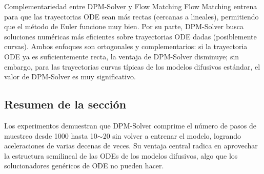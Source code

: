 \begin{knowledgebox}{Complementariedad entre DPM-Solver y Flow Matching}
Flow Matching entrena para que las trayectorias ODE sean más rectas (cercanas a lineales), permitiendo que el método de Euler funcione muy bien. Por su parte, DPM-Solver busca soluciones numéricas más eficientes sobre trayectorias ODE dadas (posiblemente curvas). Ambos enfoques son ortogonales y complementarios: si la trayectoria ODE ya es suficientemente recta, la ventaja de DPM-Solver disminuye; sin embargo, para las trayectorias curvas típicas de los modelos difusivos estándar, el valor de DPM-Solver es muy significativo.
\end{knowledgebox}

\subsection{Resumen de la sección}

Los experimentos demuestran que DPM-Solver comprime el número de pasos de muestreo desde 1000 hasta 10$\sim$20 sin volver a entrenar el modelo, logrando aceleraciones de varias decenas de veces. Su ventaja central radica en aprovechar la estructura semilineal de las ODEs de los modelos difusivos, algo que los solucionadores genéricos de ODE no pueden hacer.

